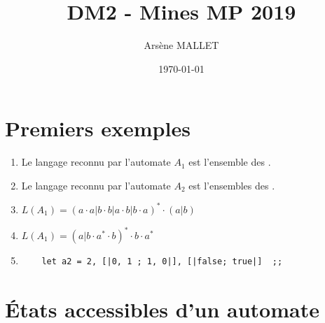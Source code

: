 \documentclass{article}
\title{DM2 - Mines MP 2019}
\date{\today}
\author{Arsène MALLET}
\begin{document}
\thispagestyle{firstpage}

\begin{center}
    \huge\bfseries{\@title}
\end{center}

\section{Premiers exemples}

\begin{enumerate}
    \item Le langage reconnu par l'automate $A_1$ est l'ensemble des .
    \item Le langage reconnu par l'automate $A_2$ est l'ensembles des .
    \item $\boxed{L(A_1) = (a \cdot a|b \cdot b|a \cdot b|b \cdot a)^* \cdot (a|b)}$
    \item $\boxed{L(A_1) = (a|b \cdot a^* \cdot b)^*\cdot b\cdot a^*}$
    \item \begin{verbatim}
    let a2 = 2, [|0, 1 ; 1, 0|], [|false; true|]  ;;
    \end{verbatim}
\end{enumerate}

\section{\'Etats accessibles d'un automate}
\end{document}
